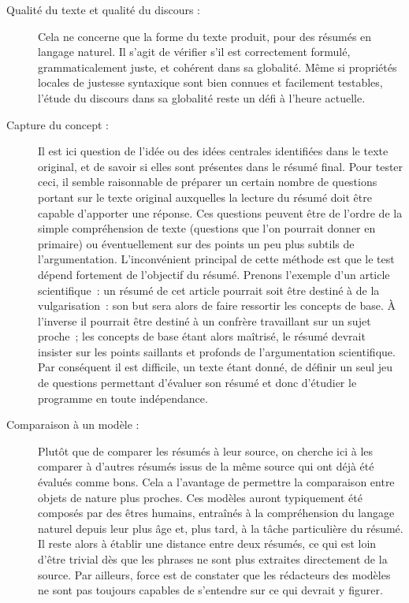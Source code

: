 \documentclass[a4paper, 12pt]{article}
\begin{document}
\begin{description}
  \item [Qualité du texte et qualité du discours :] Cela ne concerne que la forme du texte produit, pour des résumés en langage naturel. Il s'agit de vérifier s'il est correctement formulé, grammaticalement juste, et cohérent dans sa globalité. Même si propriétés locales de justesse syntaxique sont bien connues et facilement testables, l'étude du discours dans sa globalité reste un défi à l'heure actuelle.
  \item [Capture du concept :] Il est ici question de l'idée ou des idées centrales identifiées dans le texte original, et de savoir si elles sont présentes dans le résumé final. Pour tester ceci, il semble raisonnable de préparer un certain nombre de questions portant sur le texte original auxquelles la lecture du résumé doit être capable d'apporter une réponse. Ces questions peuvent être de l'ordre de la simple compréhension de texte (questions que l'on pourrait donner en primaire) ou éventuellement sur des points un peu plus subtils de l'argumentation. L'inconvénient principal de cette méthode est que le test dépend fortement de l'objectif du résumé. Prenons l'exemple d'un article scientifique~: un résumé de cet article pourrait soit être destiné à de la vulgarisation~: son but sera alors de faire ressortir les concepts de base. À l'inverse il pourrait être destiné à un confrère travaillant sur un sujet proche~; les concepts de base étant alors maîtrisé, le résumé devrait insister sur les points saillants et profonds de l'argumentation scientifique. Par conséquent il est difficile, un texte étant donné, de définir un seul jeu de questions permettant d'évaluer son résumé et donc d'étudier le programme en toute indépendance.
  \item [Comparaison à un modèle :] Plutôt que de comparer les résumés à leur source, on cherche ici à les comparer à d'autres résumés issus de la même source qui ont déjà été évalués comme bons. Cela a l'avantage de permettre la comparaison entre objets de nature plus proches. Ces modèles auront typiquement été composés par des êtres humains, entraînés à la compréhension du langage naturel depuis leur plus âge et, plus tard, à la tâche particulière du résumé. Il reste alors à établir une distance entre deux résumés, ce qui est loin d'être trivial dès que les phrases ne sont plus extraites directement de la source. Par ailleurs, force est de constater que les rédacteurs des modèles ne sont pas toujours capables de s'entendre sur ce qui devrait y figurer.
 \end{description}
\end{document}
